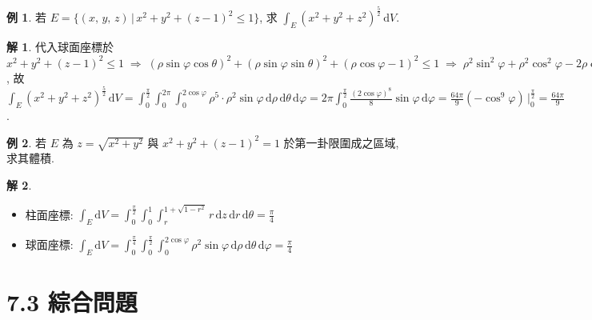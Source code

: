 \documentclass[12pt]{extarticle}
\newcommand{\ds}{\displaystyle}
\newcommand{\ie}{\;\Longrightarrow\;}
\theoremstyle{definition}
\newtheorem*{ex}{例}
\newtheorem*{sol}{解}
\begin{document}
\begin{ex}
  若 $E = \{(x,\,y,\,z)\,|\, x^2 + y^2 + (z - 1)^2 \leqslant 1\}$, 求 $\ds\int_E (x^2 + y^2 + z^2)^{\frac{5}{2}}\,\text{d}V$.
\end{ex}

\begin{sol}
  代入球面座標於 $\ds x^2 + y^2 + (z - 1)^2 \leqslant 1\ie (\rho\sin\varphi\cos\theta)^2 + (\rho\sin\varphi\sin\theta)^2 + (\rho\cos\varphi - 1)^2\leqslant 1 \ie \rho^2\sin^2\varphi + \rho^2\cos^2\varphi - 2\rho\cos\varphi + 1\leqslant 1 \ie \rho^2\leqslant 2\rho\cos\varphi \ie \rho\leqslant 2\cos\varphi$, 故 $\ds\int_E (x^2 + y^2 + z^2)^{\frac{5}{2}}\,\text{d}V = \int_0^{\frac{\pi}{2}}\!\!\int_0^{2\pi}\!\!\!\int_0^{2\cos\varphi}\!\!\rho^5\cdot\rho^2\sin\varphi\,\text{d}\rho\,\text{d}\theta\,\text{d}\varphi = 2\pi\int_0^{\frac{\pi}{2}}\!\frac{(2\cos\varphi)^8}{8}\sin\varphi\,\text{d}\varphi = \frac{64\pi}{9}(-\cos^9\varphi)\,\Big|_0^{\frac{\pi}{2}} = \frac{64\pi}{9}$.
\end{sol}

\begin{ex}
  若 $E$ 為 $z = \sqrt{x^2 + y^2}$ 與 $x^2 + y^2 + (z - 1)^2 = 1$ 於第一卦限圍成之區域, 求其體積.
\end{ex}

\begin{sol}
  \begin{minipage}{0.4\textwidth}
    \includegraphics[scale=0.7,page=77]{fig/prob.pdf} \\ 
  \end{minipage}
  \begin{minipage}{0.6\textwidth}
    \begin{itemize}
      \item 柱面座標: $\ds\int_E\text{d}V = \int_0^{\frac{\pi}{2}}\!\!\!\int_0^1\!\!\int_{r}^{1 + \sqrt{1 - r^2}}\!\!\!r\,\text{d}z\,\text{d}r\,\text{d}\theta = \frac{\pi}{4}$ 
      \item 球面座標: $\ds\int_E\text{d}V = \int_0^{\frac{\pi}{4}}\!\!\!\int_0^{\frac{\pi}{2}}\!\!\!\int_0^{2\cos\varphi}\!\!\!\rho^2\sin\varphi\,\text{d}\rho\,\text{d}\theta\,\text{d}\varphi = \frac{\pi}{4}$
    \end{itemize}
  \end{minipage}
\end{sol}

\section*{7.3 綜合問題}
\end{document}
